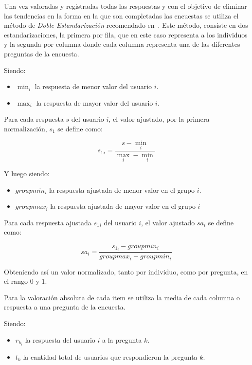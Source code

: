 Una vez valoradas y registradas todas las respuestas y con el objetivo de
eliminar las tendencias en la forma en la que son completadas las
encuestas\cite{Fischer2010} se utiliza el método de \emph{Doble Estandarización}
recomendado en~\cite{Pagolu2011}. Este método, consiste en dos
estandarizaciones, la primera por fila, que en este caso representa a los
individuos y la segunda por columna donde cada columna representa una de las
diferentes preguntas de la encuesta.

Siendo:
\begin{itemize}
	\item $\min_i$ la respuesta de menor valor del usuario $i$.
	\item $\max_i$ la respuesta de mayor valor del usuario $i$.
\end{itemize}

Para cada respuesta $s$ del usuario $i$, el valor ajustado, por la primera
normalización, $s_1$ se define como:

\begin{equation}
s_1{_i}=\frac{s-\min_i}{\max_i-\min_i}
\end{equation}

Y luego siendo:
\begin{itemize}
	\item $groupmin_i$ la respuesta ajustada de menor valor en el grupo $i$.
	\item $groupmax_i$ la respuesta ajustada de mayor valor en el grupo $i$
\end{itemize}

Para cada respuesta ajustada $s_1{_i}$ del usuario $i$, el valor ajustado $sa_i$ se
define como:	

\begin{equation}
sa_i=\frac{s_{1_i}-groupmin_i}{groupmax_i-groupmin_i}
\end{equation}

Obteniendo así un valor normalizado, tanto por individuo, como por pregunta, en
el rango $0$ y $1$.

Para la valoración absoluta de cada  item se utiliza la media de cada columna o
respuesta a una pregunta de la encuesta.

Siendo:
\begin{itemize} 
\item $r_{k_i}$ la respuesta del usuario $i$ a la pregunta $k$.
\item $t_k$ la cantidad total de usuarios que respondieron la pregunta $k$.
\end{itemize}

